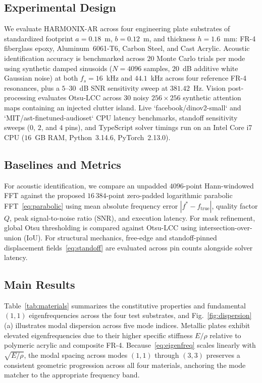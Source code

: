 \documentclass[journal]{IEEEtran}
\begin{document}
\subsection{Experimental Design}
We evaluate HARMONIX-AR across four engineering plate substrates of standardized footprint $a = 0.18$~m, $b = 0.12$~m, and thickness $h = 1.6$~mm: FR-4 fiberglass epoxy, Aluminum~6061-T6, Carbon Steel, and Cast Acrylic. Acoustic identification accuracy is benchmarked across $20$ Monte Carlo trials per mode using synthetic damped sinusoids ($N = 4096$ samples, $20$~dB additive white Gaussian noise) at both $f_s = 16$~kHz and $44.1$~kHz across four reference FR-4 resonances, plus a $5\text{--}30$~dB SNR sensitivity sweep at $381.42$~Hz. Vision post-processing evaluates Otsu-LCC across $30$ noisy $256 \times 256$ synthetic attention maps containing an injected clutter island. Live `facebook/dinov2-small` and `MIT/ast-finetuned-audioset` CPU latency benchmarks, standoff sensitivity sweeps ($0$, $2$, and $4$ pins), and TypeScript solver timings run on an Intel Core i7 CPU ($16$~GB RAM, Python~3.14.6, PyTorch~2.13.0).

\subsection{Baselines and Metrics}
For acoustic identification, we compare an unpadded $4096$-point Hann-windowed FFT against the proposed $16\,384$-point zero-padded logarithmic parabolic FFT~\eqref{eq:parabolic} using mean absolute frequency error $|f^* - f_{\mathrm{true}}|$, quality factor $Q$, peak signal-to-noise ratio (SNR), and execution latency. For mask refinement, global Otsu thresholding is compared against Otsu-LCC using intersection-over-union (IoU). For structural mechanics, free-edge and standoff-pinned displacement fields~\eqref{eq:standoff} are evaluated across pin counts alongside solver latency.

\subsection{Main Results}
Table~\ref{tab:materials} summarizes the constitutive properties and fundamental $(1,1)$ eigenfrequencies across the four test substrates, and Fig.~\ref{fig:dispersion}(a) illustrates modal dispersion across five mode indices. Metallic plates exhibit elevated eigenfrequencies due to their higher specific stiffness $E/\rho$ relative to polymeric acrylic and composite FR-4. Because~\eqref{eq:eigenfreq} scales linearly with $\sqrt{E/\rho}$, the modal spacing across modes $(1,1)$ through $(3,3)$ preserves a consistent geometric progression across all four materials, anchoring the mode matcher to the appropriate frequency band.
\end{document}
